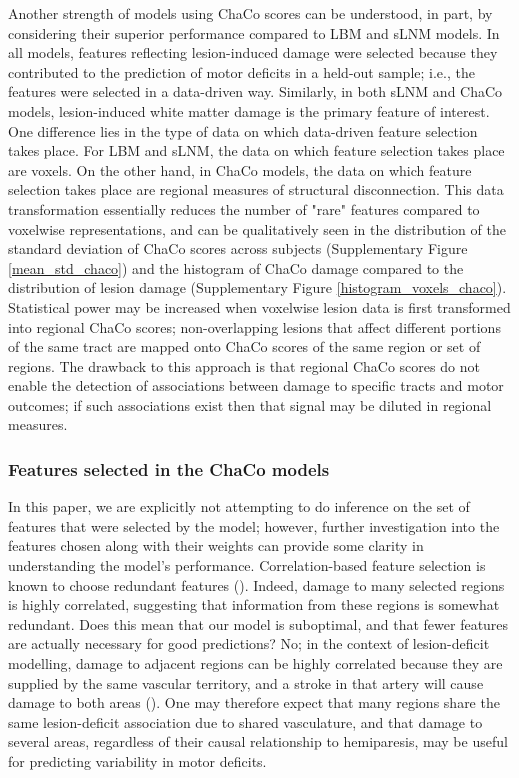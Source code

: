 \documentclass[10pt]{article}
\begin{document}
Another strength of models using ChaCo scores can be understood, in part, by considering their superior performance compared to LBM and sLNM models. In all models, features reflecting lesion-induced damage were selected because they contributed to the prediction of motor deficits in a held-out sample; i.e., the features were selected in a data-driven way. Similarly, in both sLNM and ChaCo models, lesion-induced white matter damage is the primary feature of interest. One difference lies in the type of data on which data-driven feature selection takes place. For LBM and sLNM, the data on which feature selection takes place are voxels. On the other hand, in ChaCo models, the data on which feature selection takes place are regional measures of structural disconnection. This data transformation essentially reduces the number of "rare" features compared to voxelwise representations, and can be qualitatively seen in the distribution of the standard deviation of ChaCo scores across subjects (Supplementary Figure \ref{mean_std_chaco}) and the histogram of ChaCo damage compared to the distribution of lesion damage (Supplementary Figure \ref{histogram_voxels_chaco}). Statistical power may be increased when voxelwise lesion data is first transformed into regional ChaCo scores; non-overlapping lesions that affect different portions of the same tract are mapped onto ChaCo scores of the same region or set of regions. The drawback to this approach is that regional ChaCo scores do not enable the detection of associations between damage to specific tracts and motor outcomes; if such associations exist then that signal may be diluted in regional measures. 


\subsubsection*{Features selected in the ChaCo models}
In this paper, we are explicitly not attempting to do inference on the set of features that were selected by the model; however, further investigation into the features chosen along with their weights can provide some clarity in understanding the model's performance. Correlation-based feature selection is known to choose redundant features (\cite{Guyon2003-kj}). Indeed, damage to many selected regions is highly correlated, suggesting that information from these regions is somewhat redundant. Does this mean that our model is suboptimal, and that fewer features are actually necessary for good predictions? No; in the context of lesion-deficit modelling, damage to adjacent regions can be highly correlated because they are supplied by the same vascular territory, and a stroke in that artery will cause damage to both areas (\cite{Mah2014-cb, Sperber2020-kp}). One may therefore expect that many regions share the same lesion-deficit association due to shared vasculature, and that damage to several areas, regardless of their causal relationship to hemiparesis, may be useful for predicting variability in motor deficits. 
\end{document}
